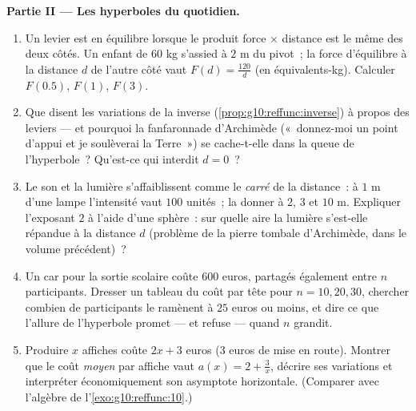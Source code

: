 \begin{problem}
\medskip
\noindent\textbf{Partie II --- Les hyperboles du quotidien.}
\begin{enumerate}[resume]
  \item Un levier est en équilibre lorsque le produit force $\times$
        distance est le même des deux côtés. Un enfant de $60$ kg
        s'assied à $2$ m du pivot~; la force d'équilibre à la
        distance $d$ de l'autre côté vaut $F(d) = \frac{120}{d}$ (en
        équivalents-kg). Calculer $F(0.5)$, $F(1)$, $F(3)$.
  \item Que disent les variations de la  inverse
        (\cref{prop:g10:reffunc:inverse}) à propos des leviers ---
        et pourquoi la fanfaronnade d'Archimède («~donnez-moi un
        point d'appui et je soulèverai la Terre~») se cache-t-elle
        dans la queue de l'hyperbole~? Qu'est-ce qui interdit
        $d = 0$~?
  \item Le son et la lumière s'affaiblissent comme le \emph{carré}
        de la distance~: à $1$ m d'une lampe l'intensité vaut $100$
        unités~; la donner à $2$, $3$ et $10$ m. Expliquer
        l'exposant $2$ à l'aide d'une sphère~: sur quelle aire la
        lumière s'est-elle répandue à la distance $d$ (problème de
        la pierre tombale d'Archimède, dans le volume précédent)~?
  \item Un car pour la sortie scolaire coûte $600$ euros, partagés
        également entre $n$ participants. Dresser un tableau du coût
        par tête pour $n = 10, 20, 30$, chercher combien de
        participants le ramènent à $25$ euros ou moins, et dire ce
        que l'allure de l'hyperbole promet --- et refuse --- quand
        $n$ grandit.
  \item Produire $x$ affiches coûte $2x + 3$ euros ($3$ euros de
        mise en route). Montrer que le coût \emph{moyen} par affiche
        vaut $a(x) = 2 + \frac3x$, décrire ses variations et
        interpréter économiquement son asymptote horizontale.
        (Comparer avec l'algèbre de l'\cref{exo:g10:reffunc:10}.)
\end{enumerate}


\end{problem}
